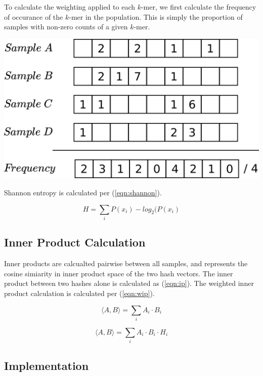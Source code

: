 \documentclass[a0,portrait]{a0poster}
\begin{document}
\begin{multicols}{2}
To calculate the weighting applied to each $k$-mer, we first calculate the
frequency of occurance of the $k$-mer in the population. This is simply the
proportion of samples with non-zero counts of a given $k$-mer.

\begin{center}
  \vspace{1cm}
  \includegraphics[width=25cm]{freq_vector.png}
  \vspace{1cm}
\end{center}

Shannon entropy is calculated per (\ref{eqn:shannon}).

\begin{equation}
  H = \sum_{i} P(x_i) -log_2(P(x_i)
\label{eqn:shannon}
\end{equation}

\subsection*{Inner Product Calculation}

Inner products are calcualted pairwise between all samples, and represents the
cosine simiarity in inner product space of the two hash vectors. The inner
product between two hashes alone is calculated as (\ref{eqn:ip}). The weighted
inner product calculation is calculated per (\ref{eqn:wip}).

\begin{equation}
  \langle A, B \rangle = \sum_{i} A_i \cdot B_i
\label{eqn:ip}
\end{equation}

\begin{equation}
  \langle A, B \rangle = \sum_{i} A_i \cdot B_i \cdot H_i
\label{eqn:wip}
\end{equation}

\subsection*{Implementation}


\end{multicols}
\end{document}
